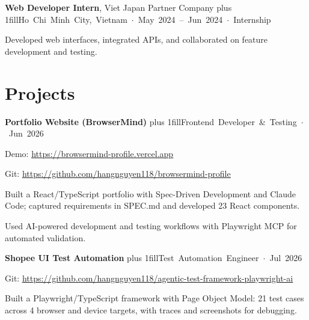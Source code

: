 \documentclass[11pt,a4paper]{article}
\let\cvhref\href
\renewcommand{\href}[2]{\cvhref{#1}{\uline{#2}}}
\newcommand{\cvsection}[1]{\section*{#1}}
\newcommand{\cvfill}{\hskip 0pt plus 1fill\relax}
\newcommand{\cvitem}[2]{%
  \vspace{0.3em}%
  #1\cvfill\mbox{\footnotesize\color{muted}#2}\par
}
\newcommand{\cvlinks}[1]{{\small\color{muted}#1}\par}
\begin{document}
\cvitem{\textbf{Web Developer Intern}, Viet Japan Partner Company}{Ho Chi Minh City, Vietnam $\cdot$ May 2024 – Jun 2024 $\cdot$ Internship}
\begin{cvbullets}
  \item Developed web interfaces, integrated APIs, and collaborated on feature development and testing.
\end{cvbullets}
\cvsection{Projects}
\cvitem{\textbf{Portfolio Website (BrowserMind)}}{Frontend Developer \& Testing $\cdot$ Jun 2026}
\cvlinks{Demo: \href{https://browsermind-profile.vercel.app}{https://browsermind-profile.vercel.app}}
\cvlinks{Git: \href{https://github.com/hangnguyen118/browsermind-profile}{https://github.com/hangnguyen118/browsermind-profile}}
\begin{cvbullets}
  \item Built a React/TypeScript portfolio with Spec-Driven Development and Claude Code; captured requirements in SPEC.md and developed 23 React components.
  \item Used AI-powered development and testing workflows with Playwright MCP for automated validation.
\end{cvbullets}
\cvitem{\textbf{Shopee UI Test Automation}}{Test Automation Engineer $\cdot$ Jul 2026}
\cvlinks{Git: \href{https://github.com/hangnguyen118/agentic-test-framework-playwright-ai}{https://github.com/hangnguyen118/agentic-test-framework-playwright-ai}}
\begin{cvbullets}
  \item Built a Playwright/TypeScript framework with Page Object Model: 21 test cases across 4 browser and device targets, with traces and screenshots for debugging.
\end{cvbullets}
\end{document}
